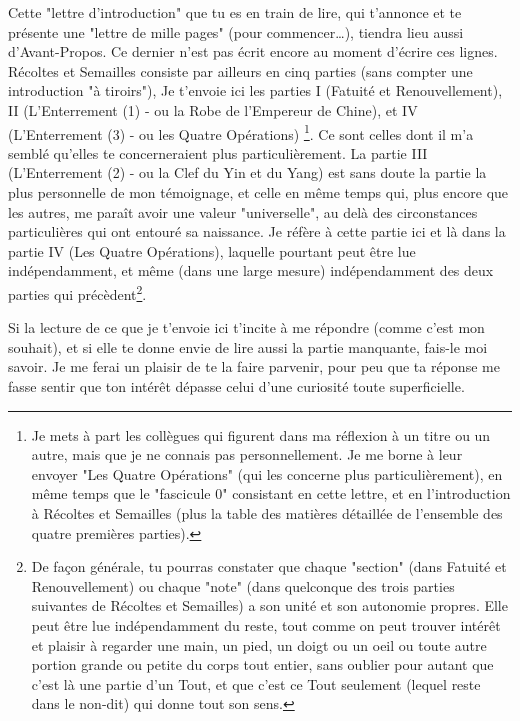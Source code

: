 Cette "lettre d'introduction" que tu es en train de lire, qui t'annonce et te présente une "lettre de mille pages" (pour commencer\ldots), tiendra lieu aussi d'Avant-Propos. Ce dernier n'est pas écrit encore au moment d'écrire ces lignes. Récoltes et Semailles consiste par ailleurs en cinq parties (sans compter une introduction "à tiroirs"), Je t'envoie ici les parties I (Fatuité et Renouvellement), II (L'Enterrement (1) - ou la Robe de l'Empereur de Chine), et IV (L'Enterrement (3) - ou les Quatre Opérations) \footnote{Je mets à part les collègues qui figurent dans ma réflexion à un titre ou un autre, mais que je ne connais pas personnellement. Je me borne à leur envoyer "Les Quatre Opérations" (qui les concerne plus particulièrement), en même temps que le "fascicule 0" consistant en cette lettre, et en l'introduction à Récoltes et Semailles (plus la table des matières détaillée de l'ensemble des quatre premières parties).}. Ce sont celles dont il m'a semblé qu'elles te concerneraient plus particulièrement. La partie III (L'Enterrement (2) - ou la Clef du Yin et du Yang) est sans doute la partie la plus personnelle de mon témoignage, et celle en même temps qui, plus encore que les autres, me paraît avoir une valeur "universelle", au delà des circonstances particulières qui ont entouré sa naissance. Je réfère à cette partie ici et là dans la partie IV (Les Quatre Opérations), laquelle pourtant peut être lue indépendamment, et même (dans une large mesure) indépendamment des deux parties qui précèdent\footnote{De façon générale, tu pourras constater que chaque "section" (dans Fatuité et Renouvellement) ou chaque "note" (dans quelconque des trois parties suivantes de Récoltes et Semailles) a son unité et son autonomie propres. Elle peut être lue indépendamment du reste, tout comme on peut trouver intérêt et plaisir à regarder une main, un pied, un doigt ou un oeil ou toute autre portion grande ou petite du corps tout entier, sans oublier pour autant que c'est là une partie d'un Tout, et que c'est ce Tout seulement (lequel reste dans le non-dit) qui donne tout son sens.}.

Si la lecture de ce que je t'envoie ici t'incite à me répondre (comme c'est mon souhait), et si elle te donne envie de lire aussi la partie manquante, fais-le moi savoir. Je me ferai un plaisir de te la faire parvenir, pour peu que ta réponse me fasse sentir que ton intérêt dépasse celui d'une curiosité toute superficielle.
